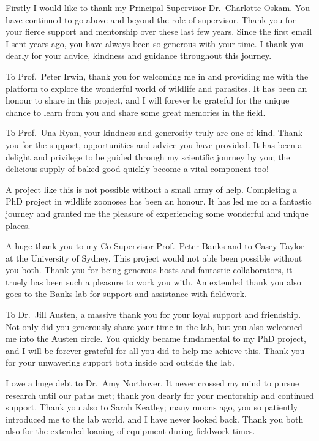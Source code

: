 \documentclass[a4paper, nobind]{templates/ociamthesis}
\begin{document}
\begin{romanpages}


\begin{acknowledgements}
 	Firstly I would like to thank my Principal Supervisor Dr.~Charlotte Oskam.
  You have continued to go above and beyond the role of supervisor. Thank you for your fierce support and mentorship over these last few years.
  Since the first email I sent years ago, you have always been so generous with your time. I thank you dearly for your advice, kindness and guidance throughout this journey.

  To Prof.~Peter Irwin, thank you for welcoming me in and providing me with the platform to explore the wonderful world of wildlife and parasites.
  It has been an honour to share in this project, and I will forever be grateful for the unique chance to learn from you and share some great memories in the field.

  To Prof.~Una Ryan, your kindness and generosity truly are one-of-kind.
  Thank you for the support, opportunities and advice you have provided.
  It has been a delight and privilege to be guided through my scientific journey by you; the delicious supply of baked good quickly become a vital component too!

  A project like this is not possible without a small army of help. Completing a PhD project in wildlife zoonoses has been an honour.
  It has led me on a fantastic journey and granted me the pleasure of experiencing some wonderful and unique places.

  A huge thank you to my Co-Supervisor Prof.~Peter Banks and to Casey Taylor at the University of Sydney. This project would not able been possible without you both.
  Thank you for being generous hosts and fantastic collaborators, it truely has been such a pleasure to work you with.
  An extended thank you also goes to the Banks lab for support and assistance with fieldwork.

  To Dr.~Jill Austen, a massive thank you for your loyal support and friendship.
  Not only did you generously share your time in the lab, but you also welcomed me into the Austen circle.
  You quickly became fundamental to my PhD project, and I will be forever grateful for all you did to help me achieve this.
  Thank you for your unwavering support both inside and outside the lab.

  I owe a huge debt to Dr.~Amy Northover. It never crossed my mind to pursue research until our paths met; thank you dearly for your mentorship and continued support. Thank you also to Sarah Keatley; many moons ago, you so patiently introduced me to the lab world, and I have never looked back. Thank you both also for the extended loaning of equipment during fieldwork times.


\end{acknowledgements}
\end{romanpages}
\end{document}
